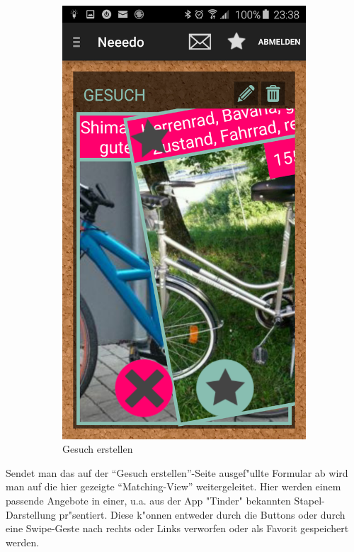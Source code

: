 \begin{figure}[H]
\begin{subfigure}{0.5\textwidth}
\includegraphics[width=0.9\linewidth]{./Bilder/matching2.png}
\caption{Gesuch erstellen}
\label{fig:match2}
\end{subfigure}
\caption{}
\label{fig:image5}
\end{figure}

Sendet man das auf der \enquote{Gesuch erstellen}-Seite ausgef"ullte Formular ab wird man auf die hier gezeigte \enquote{Matching-View} weitergeleitet. 
Hier werden einem passende Angebote in einer, u.a. aus der App "Tinder" bekannten Stapel-Darstellung pr"sentiert. 
Diese k"onnen entweder durch die Buttons oder durch eine Swipe-Geste nach rechts oder Links verworfen oder als Favorit gespeichert werden. 


